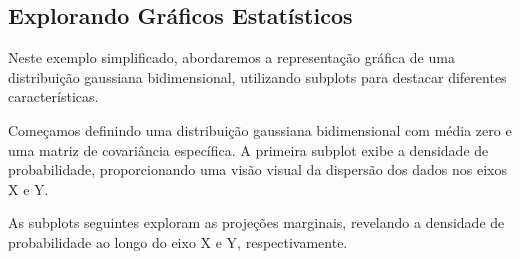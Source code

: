 \documentclass[letterpaper,10pt,english]{jupyterBook}
\begin{document}
\subsection{Explorando Gráficos Estatísticos}
\label{\detokenize{chapters/ch7/ch7:explorando-graficos-estatisticos}}
\sphinxAtStartPar
Neste exemplo simplificado, abordaremos a representação gráfica de uma distribuição gaussiana bidimensional, utilizando subplots para destacar diferentes características.

\sphinxAtStartPar
Começamos definindo uma distribuição gaussiana bidimensional com média zero e uma matriz de covariância específica. A primeira subplot exibe a densidade de probabilidade, proporcionando uma visão visual da dispersão dos dados nos eixos X e Y.

\sphinxAtStartPar
As subplots seguintes exploram as projeções marginais, revelando a densidade de probabilidade ao longo do eixo X e Y, respectivamente.
\end{document}
